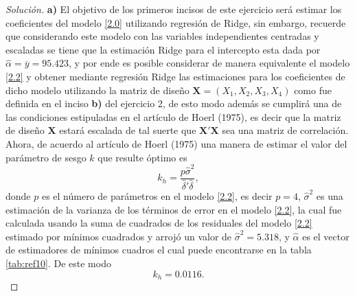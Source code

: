 \documentclass[10.5pt,notitlepage]{article}
\newenvironment{solucion}
  {\begin{proof}[Solución]}
  {\end{proof}}
\theoremstyle{plain}
\begin{document}
\begin{solucion}
\textbf{a)} El objetivo de los primeros incisos de este ejercicio será estimar los coeficientes del modelo \eqref{2.0} utilizando regresión de Ridge, sin embargo, recuerde que considerando este modelo con las variables independientes centradas y escaladas se tiene que la estimación Ridge para el intercepto esta dada por \(\hat{\alpha} = \overline{y} = 95.423\), y por ende es posible considerar de manera equivalente el modelo \eqref{2.2} y obtener mediante regresión Ridge las estimaciones para los coeficientes de dicho modelo utilizando la matriz de diseño \(\mathbf{X} = (X_1, X_2, X_3, X_4)\) como fue definida en el inciso \textbf{b)} del ejercicio 2, de esto modo además se cumplirá una de las condiciones estipuladas en el artículo de Hoerl (1975), es decir que la matriz de diseño \(\mathbf{X}\) estará escalada de tal suerte que \(\mathbf{X}'\mathbf{X}\) sea una matriz de correlación. Ahora, de acuerdo al artículo de Hoerl (1975) una manera de estimar el valor del parámetro de sesgo \(\mathit{k}\) que resulte óptimo es 
\begin{equation*}
    \mathit{k_h} = \frac{p \hat{\sigma}^2}{\hat{\delta}' \hat{\delta}},
\end{equation*}
donde \(p\) es el número de parámetros en el modelo \eqref{2.2}, es decir \(p = 4\), \(\hat{\sigma}^2\) es una estimación de la varianza de los términos de error en el modelo \eqref{2.2}, la cual fue calculada usando la suma de cuadrados de los residuales del modelo \eqref{2.2} estimado por mínimos cuadrados y arrojó un valor de \(\hat{\sigma}^2 = 5.318\), y \(\hat{\alpha}\) es el vector de estimadores de mínimos cuadros el cual puede encontrarse en la tabla \ref{tab:ref10}. De este modo 
\begin{equation*}
     \mathit{k_h} = 0.0116.
\end{equation*}


\end{solucion}
\end{document}
